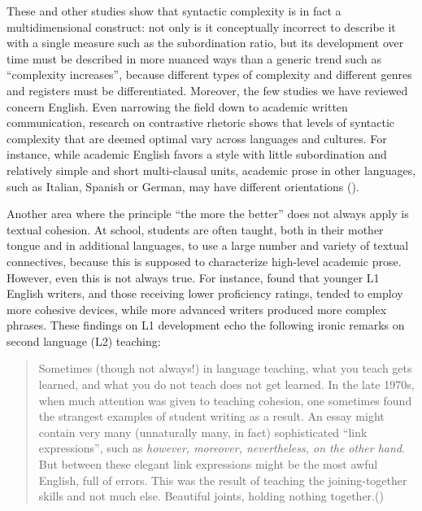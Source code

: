 \documentclass[output=paper]{langscibook}
\begin{document}
These and other studies show that syntactic complexity is in fact a multidimensional construct: not only is it conceptually incorrect to describe it with a single measure such as the subordination ratio, but its development over time must be described in more nuanced ways than a generic trend such as “complexity increases”, because different types of complexity and different genres and registers must be differentiated. Moreover, the few studies we have reviewed concern English. Even narrowing the field down to academic written communication, research on contrastive rhetoric shows that levels of syntactic complexity that are deemed optimal vary across languages and cultures. For instance, while academic English favors a style with little subordination and relatively simple and short multi-clausal units, academic prose in other languages, such as Italian, Spanish or German, may have different orientations (\citealt{Connor2002,Connor2018, Ortega2012}). 

Another area where the principle “the more the better” does not always apply is textual cohesion. At school, students are often taught, both in their mother tongue and in additional languages, to use a large number and variety of textual connectives, because this is supposed to characterize high-level academic prose. However, even this is not always true. For instance, \citet{CrossleyEtAl2011} found that younger L1 English writers, and those receiving lower proficiency ratings, tended to employ more cohesive devices, while more advanced writers produced more complex phrases. These findings on L1 development echo the following ironic remarks on second language (L2) teaching:  

\begin{quote}
Sometimes (though not always!) in language teaching, what you teach gets learned, and what you do not teach does not get learned. In the late 1970s, when much attention was given to teaching cohesion, one sometimes found the strangest examples of student writing as a result. An essay might contain very many (unnaturally many, in fact) sophisticated “link expressions”, such as \textit{however, moreover, nevertheless, on the other hand}. But between these elegant link expressions might be the most awful English, full of errors. This was the result of teaching the joining-together skills and not much else. Beautiful joints, holding nothing together.\hbox{}\hfill\hbox{(\citealt[294]{Johnson2018})}
\end{quote}
\end{document}
